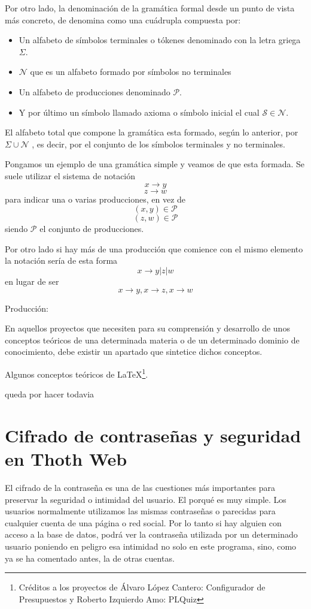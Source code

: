 Por otro lado, la denominación de la gramática formal desde un punto de vista más concreto, de denomina como una cuádrupla compuesta por:

\begin{itemize}
	\item Un alfabeto de símbolos terminales o tókenes denominado con la letra griega $\Sigma$.
	\item $\mathcal{N}$ que es un alfabeto formado por símbolos no terminales
	\item Un alfabeto de producciones denominado $\mathcal{P}$.
	\item Y por último un símbolo llamado axioma o símbolo inicial el cual $\mathcal{S} \in \mathcal{N}$.
\end{itemize}

El alfabeto total que compone la gramática esta formado, según lo anterior, por $\Sigma\cup\mathcal{N}$ , es decir, por el conjunto de los símbolos terminales y no terminales.

Pongamos un ejemplo de una gramática simple y veamos de que esta formada. Se suele utilizar el sistema de notación  \[x \rightarrow y\] \[z \rightarrow w\] para indicar una o varias producciones, en vez de \[(x, y) \in \mathcal{P} \] \[(z, w) \in \mathcal{P} \] siendo $\mathcal{P}$ el conjunto de producciones.

Por otro lado si hay más de una producción que comience con el mismo elemento la notación sería de esta forma \[ x \rightarrow y | z | w\] en lugar de ser \[ x \rightarrow y, x \rightarrow z, x \rightarrow w\]


Producción: 

En aquellos proyectos que necesiten para su comprensión y desarrollo de unos conceptos teóricos de una determinada materia o de un determinado dominio de conocimiento, debe existir un apartado que sintetice dichos conceptos.

Algunos conceptos teóricos de \LaTeX \footnote{Créditos a los proyectos de Álvaro López Cantero: Configurador de Presupuestos y Roberto Izquierdo Amo: PLQuiz}.


queda por hacer todavia

\section{Cifrado de contraseñas y seguridad en Thoth Web}

El cifrado de la contraseña es una de las cuestiones más importantes para preservar la seguridad o intimidad del usuario. El porqué es muy simple. Los usuarios normalmente utilizamos las mismas contraseñas o parecidas para cualquier cuenta de una página o red social. Por lo tanto si hay alguien con acceso a la base de datos, podrá ver la contraseña utilizada por un determinado usuario poniendo en peligro esa intimidad no solo en este programa, sino, como ya se ha comentado antes, la de otras cuentas.


